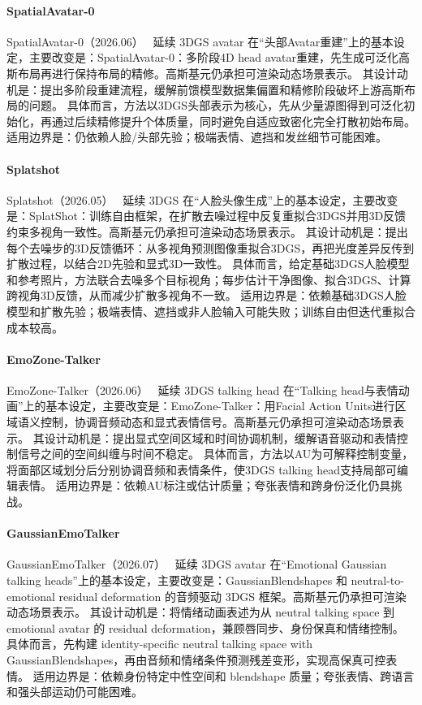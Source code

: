 \paragraph{SpatialAvatar-0}
SpatialAvatar-0（2026.06）~\cite{2606_15659} 延续 3DGS avatar 在“头部Avatar重建”上的基本设定，主要改变是：SpatialAvatar-0：多阶段4D head avatar重建，先生成可泛化高斯布局再进行保持布局的精修。高斯基元仍承担可渲染动态场景表示。
其设计动机是：提出多阶段重建流程，缓解前馈模型数据集偏置和精修阶段破坏上游高斯布局的问题。
具体而言，方法以3DGS头部表示为核心，先从少量源图得到可泛化初始化，再通过后续精修提升个体质量，同时避免自适应致密化完全打散初始布局。
适用边界是：仍依赖人脸/头部先验；极端表情、遮挡和发丝细节可能困难。

\paragraph{Splatshot}
Splatshot（2026.05）~\cite{2606_01493} 延续 3DGS 在“人脸头像生成”上的基本设定，主要改变是：SplatShot：训练自由框架，在扩散去噪过程中反复重拟合3DGS并用3D反馈约束多视角一致性。高斯基元仍承担可渲染动态场景表示。
其设计动机是：提出每个去噪步的3D反馈循环：从多视角预测图像重拟合3DGS，再把光度差异反传到扩散过程，以结合2D先验和显式3D一致性。
具体而言，给定基础3DGS人脸模型和参考照片，方法联合去噪多个目标视角；每步估计干净图像、拟合3DGS、计算跨视角3D反馈，从而减少扩散多视角不一致。
适用边界是：依赖基础3DGS人脸模型和扩散先验；极端表情、遮挡或非人脸输入可能失败；训练自由但迭代重拟合成本较高。

\paragraph{EmoZone-Talker}
EmoZone-Talker（2026.06）~\cite{2606_15848} 延续 3DGS talking head 在“Talking head与表情动画”上的基本设定，主要改变是：EmoZone-Talker：用Facial Action Units进行区域语义控制，协调音频动态和显式表情信号。高斯基元仍承担可渲染动态场景表示。
其设计动机是：提出显式空间区域和时间协调机制，缓解语音驱动和表情控制信号之间的空间纠缠与时间不稳定。
具体而言，方法以AU为可解释控制变量，将面部区域划分后分别协调音频和表情条件，使3DGS talking head支持局部可编辑表情。
适用边界是：依赖AU标注或估计质量；夸张表情和跨身份泛化仍具挑战。

\paragraph{GaussianEmoTalker}
GaussianEmoTalker（2026.07）~\cite{2607_00959} 延续 3DGS avatar 在“Emotional Gaussian talking heads”上的基本设定，主要改变是：GaussianBlendshapes 和 neutral-to-emotional residual deformation 的音频驱动 3DGS 框架。高斯基元仍承担可渲染动态场景表示。
其设计动机是：将情绪动画表述为从 neutral talking space 到 emotional avatar 的 residual deformation，兼顾唇同步、身份保真和情绪控制。
具体而言，先构建 identity-specific neutral talking space with GaussianBlendshapes，再由音频和情绪条件预测残差变形，实现高保真可控表情。
适用边界是：依赖身份特定中性空间和 blendshape 质量；夸张表情、跨语言和强头部运动仍可能困难。

